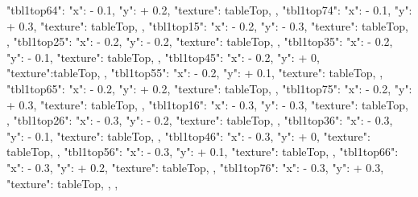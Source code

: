 {{{      "tbl1top64":{ "x": - 0.1, "y": + 0.2, "texture": tableTop, },
      "tbl1top74":{ "x": - 0.1, "y": + 0.3, "texture": tableTop, },
      "tbl1top15":{ "x": - 0.2, "y": - 0.3, "texture": tableTop, },
      "tbl1top25":{ "x": - 0.2, "y": - 0.2, "texture": tableTop, },
      "tbl1top35":{ "x": - 0.2, "y": - 0.1, "texture": tableTop, },
      "tbl1top45":{ "x": - 0.2, "y": + 0, "texture":tableTop, },
      "tbl1top55":{ "x": - 0.2, "y": + 0.1, "texture": tableTop, },
      "tbl1top65":{ "x": - 0.2, "y": + 0.2, "texture": tableTop, },
      "tbl1top75":{ "x": - 0.2, "y": + 0.3, "texture": tableTop, },
      "tbl1top16":{ "x": - 0.3, "y": - 0.3, "texture": tableTop, },
      "tbl1top26":{ "x": - 0.3, "y": - 0.2, "texture": tableTop, },
      "tbl1top36":{ "x": - 0.3, "y": - 0.1, "texture": tableTop, },
      "tbl1top46":{ "x": - 0.3, "y": + 0, "texture": tableTop, },
      "tbl1top56":{ "x": - 0.3, "y": + 0.1, "texture": tableTop, },
      "tbl1top66":{ "x": - 0.3, "y": + 0.2, "texture": tableTop, },
      "tbl1top76":{ "x": - 0.3, "y": + 0.3, "texture": tableTop, },
    }
  },
  
}
